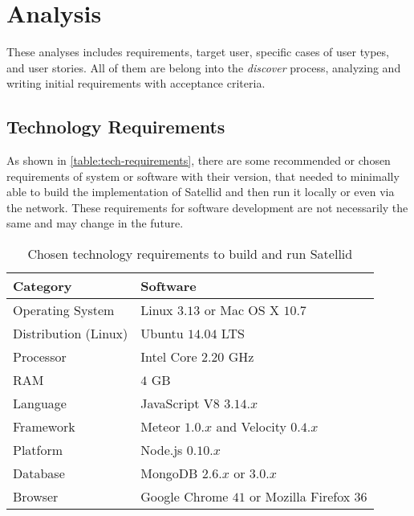 \section{Analysis}
\label{sec:analysis}

These analyses includes requirements, target user, specific cases of user types, and user stories.
All of them are belong into the \textit{discover} process, analyzing and writing initial requirements with acceptance criteria.

\subsection{Technology Requirements}

As shown in \autoref{table:tech-requirements}, there are some recommended or chosen requirements of system or software with their version, that needed to minimally able to build the implementation of Satellid and then run it locally or even via the network.
These requirements for software development are not necessarily the same and may change in the future.

\begin{table}[!h]
\centering
\caption[Chosen technology requirements]{Chosen technology requirements to build and run Satellid}
\label{table:tech-requirements}
\begin{tabular}{ |l||l| }
\hline
Category & Software  \\ \hline
\hline
Operating System      &  Linux $3.13$ or Mac OS X $10.7$  \\ \hline
Distribution (Linux)  &  Ubuntu $14.04$ LTS  \\ \hline
Processor  &  Intel Core $2.20$ GHz   \\ \hline
RAM        &  $4$ GB                  \\ \hline
Language   &  JavaScript V8 $3.14.x$  \\ \hline
Framework  &  Meteor $1.0.x$ and Velocity $0.4.x$  \\ \hline
Platform   &  Node.js $0.10.x$            \\ \hline
Database   &  MongoDB $2.6.x$ or $3.0.x$  \\ \hline
Browser    &  Google Chrome $41$ or Mozilla Firefox $36$ \\ \hline
\end{tabular}
\end{table}

